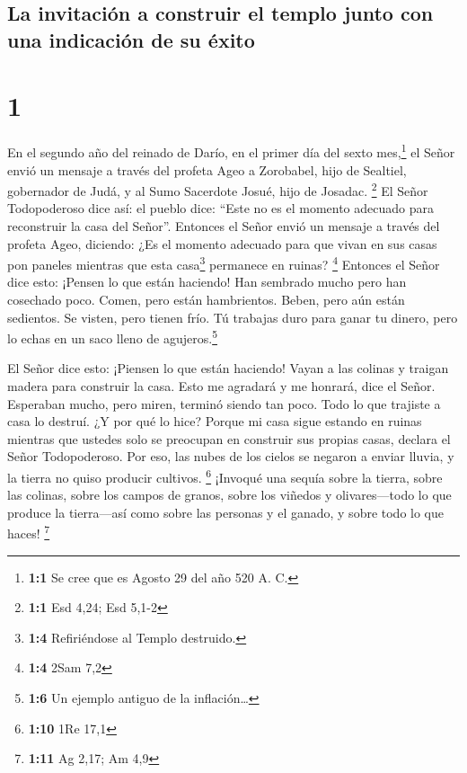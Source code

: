 \hypertarget{la-invitaciuxf3n-a-construir-el-templo-junto-con-una-indicaciuxf3n-de-su-uxe9xito}{%
\subsection{La invitación a construir el templo junto con una indicación
de su
éxito}\label{la-invitaciuxf3n-a-construir-el-templo-junto-con-una-indicaciuxf3n-de-su-uxe9xito}}

\hypertarget{section}{%
\section{1}\label{section}}

 En el segundo año del reinado de Darío, en el primer día
del sexto mes,\footnote{\textbf{1:1} Se cree que es Agosto 29 del año
  520 A. C.} el Señor envió un mensaje a través del profeta Ageo a
Zorobabel, hijo de Sealtiel, gobernador de Judá, y al Sumo Sacerdote
Josué, hijo de Josadac. \footnote{\textbf{1:1} Esd 4,24; Esd 5,1-2}
 El Señor Todopoderoso dice así: el pueblo dice: ``Este no
es el momento adecuado para reconstruir la casa del Señor''.
 Entonces el Señor envió un mensaje a través del profeta
Ageo, diciendo:  ¿Es el momento adecuado para que vivan en
sus casas pon paneles mientras que esta casa\footnote{\textbf{1:4}
  Refiriéndose al Templo destruido.} permanece en ruinas? \footnote{\textbf{1:4}
  2Sam 7,2}  Entonces el Señor dice esto: ¡Pensen lo que
están haciendo!  Han sembrado mucho pero han cosechado
poco. Comen, pero están hambrientos. Beben, pero aún están sedientos. Se
visten, pero tienen frío. Tú trabajas duro para ganar tu dinero, pero lo
echas en un saco lleno de agujeros.\footnote{\textbf{1:6} Un ejemplo
  antiguo de la inflación\ldots{}}

 El Señor dice esto: ¡Piensen lo que están haciendo!
 Vayan a las colinas y traigan madera para construir la
casa. Esto me agradará y me honrará, dice el Señor. 
Esperaban mucho, pero miren, terminó siendo tan poco. Todo lo que
trajiste a casa lo destruí. ¿Y por qué lo hice? Porque mi casa sigue
estando en ruinas mientras que ustedes solo se preocupan en construir
sus propias casas, declara el Señor Todopoderoso.  Por
eso, las nubes de los cielos se negaron a enviar lluvia, y la tierra no
quiso producir cultivos. \footnote{\textbf{1:10} 1Re 17,1}
 ¡Invoqué una sequía sobre la tierra, sobre las colinas,
sobre los campos de granos, sobre los viñedos y olivares---todo lo que
produce la tierra---así como sobre las personas y el ganado, y sobre
todo lo que haces! \footnote{\textbf{1:11} Ag 2,17; Am 4,9}

